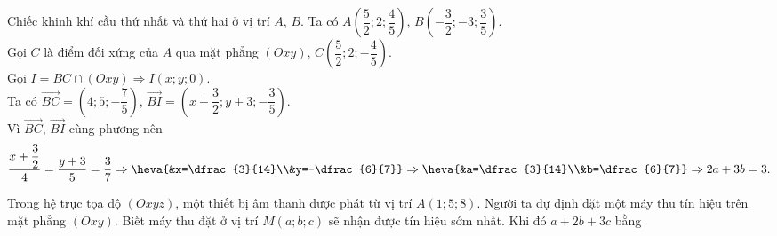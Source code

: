 \begin{bt}
{\begin{center}
		\end{center}
		Chiếc khinh khí cầu thứ nhất và thứ hai ở vị trí $A$, $B$. Ta có $A\left(\dfrac{5}{2};2;\dfrac{4}{5}\right)$, $B\left(-\dfrac{3}{2};-3;\dfrac{3}{5}\right)$.\\
		Gọi $C$ là điểm đối xứng của $A$ qua mặt phẳng $(Oxy)$, $C\left(\dfrac{5}{2};2;-\dfrac{4}{5}\right)$.\\ Gọi $I=BC\cap (Oxy)\Rightarrow I(x;y;0)$.\\ 
		Ta có
		$\overrightarrow{BC}=\left(4;5;-\dfrac{7}{5}\right)$, $\overrightarrow{BI}=\left(x+\dfrac{3}{2};y+3;-\dfrac{3}{5}\right)$.\\
		Vì $\overrightarrow{BC}$, $\overrightarrow{BI}$ cùng phương nên 
		$$\dfrac{x+\dfrac{3}{2}}{4}=\dfrac{y+3}{5}=\dfrac{3}{7}
		\Rightarrow\heva{&x=\dfrac{3}{14}\\&y=-\dfrac{6}{7}}
		\Rightarrow\heva{&a=\dfrac{3}{14}\\&b=\dfrac{6}{7}}
		\Rightarrow 2a+3b=3.$$
	}
\end{bt}

\begin{bt}%
	Trong hệ trục tọa độ $(Oxyz)$, một thiết bị âm thanh được phát từ vị trí $A(1; 5; 8)$. Người ta dự định đặt một máy thu tín hiệu trên mặt phẳng $(Oxy)$. Biết máy thu đặt ở vị trí $M(a; b; c)$ sẽ nhận được tín hiệu sớm nhất. Khi đó $a+2b+3c$ bằng
\end{bt}

